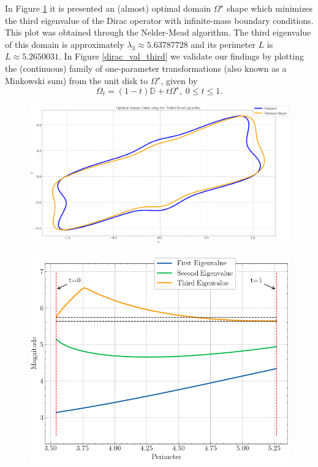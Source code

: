 In Figure \ref{dirac_nelder_mead_domain} it is presented an (almost) optimal domain \(\Omega^\star\) shape which minimizes the third eigenvalue of the Dirac operator with infinite-mass boundary conditions. This plot was obtained through the Nelder-Mead algorithm. The third eigenvalue of this domain is approximately \(\lambda_3 \approx 5.63787728\) and its perimeter \(L\) is \(L \approx 5.2650031\). In Figure \ref{dirac_val_third} we validate our findings by plotting the (continuous) family of one-parameter transformations (also known as a Minkowski sum) from the unit disk to \(\Omega^\star\), given by
\[
   \Omega_t = (1-t)\mathbb{D} + t \Omega^\star, \; 0 \leq t \leq 1.
\]
\begin{figure}[!htb]
    \centering
    \begin{minipage}{.5\textwidth}
        \centering
        \includegraphics[width=1\linewidth]{Images/Dirac/smooth/nelder_mead_optimal.png}
        \captionsetup{width=0.8\linewidth} %
        \label{dirac_nelder_mead_domain}
    \end{minipage}%
    \hfill
    \begin{minipage}{.5\textwidth}
        \centering
        \includegraphics[width=0.9\linewidth]{Images/Dirac/smooth/dirac_val_third.png}

\end{minipage}
\end{figure}
